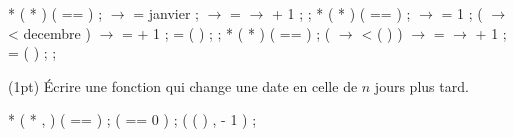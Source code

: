 \begin{solution}
  \begin{Ccode}
    \ctab{}\cstruct {} *
    \ctab{} ( \cstruct {} *  )
    \ctab{}\lb
    \ctab{}  \cif (  ==  )
    \ctab{}    \creturn {} ;
    \ctab{}
    \ctab{}  \ensuremath{\rightarrow} = janvier ;
    \ctab{}  \ensuremath{\rightarrow} = \ensuremath{\rightarrow} + 1 ;
    \ctab{}  \creturn {} ;
    \ctab{}\rb
    \ctab{}
    \ctab{}\cstruct {} *
    \ctab{} ( \cstruct {} *  )
    \ctab{}\lb
    \ctab{}  \cif (  ==  )
    \ctab{}    \creturn {} ;
    \ctab{}
    \ctab{}  \ensuremath{\rightarrow} = 1 ;
    \ctab{}  \cif ( \ensuremath{\rightarrow} < decembre ) 
    \ctab{}    \ensuremath{\rightarrow} =  + 1 ;
    \ctab{}  \celse
    \ctab{}     =   (  ) ;
    \ctab{}  \creturn {} ;
    \ctab{}\rb
    \ctab{}
    \ctab{}\cstruct {} *
    \ctab{} ( \cstruct {} *  )
    \ctab{}\lb
    \ctab{}  \cif (  ==  )
    \ctab{}    \creturn {} ;
    \ctab{}
    \ctab{}  \cif ( \ensuremath{\rightarrow} <  (  ) )
    \ctab{}    \ensuremath{\rightarrow} = \ensuremath{\rightarrow} + 1 ;
    \ctab{}  \celse
    \ctab{}    =  (  ) ;
    \ctab{}  \creturn {} ;
    \ctab{}\rb
  \end{Ccode}
\end{solution}

\question (1pt) {\'E}crire une fonction  qui change une date
en celle de $n$ jours plus tard.

\begin{petitexemple}
\end{petitexemple}

\begin{solution}
  \begin{Ccode}
    \ctab{}\cstruct {} * \ctab{} ( \cstruct
     *  , \cint {} ) \ctab{}\lb \ctab{} \cif
    (  ==  ) \ctab{} \creturn {} ; \ctab{}
    \cif (  == 0 ) \ctab{} \creturn {} ; \ctab{} \ctab{}
    \creturn {} (  (  )
    ,  - 1 ) ; \ctab{}\rb
  \end{Ccode}
\end{solution}
